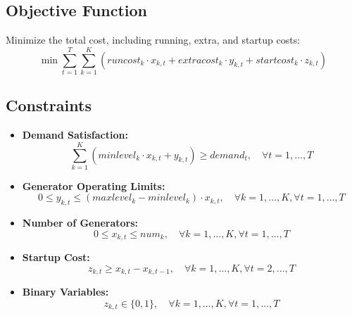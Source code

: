 \documentclass{article}
\begin{document}
\subsection*{Objective Function}
Minimize the total cost, including running, extra, and startup costs:
\[
\min \sum_{t=1}^{T} \sum_{k=1}^{K} \left( runcost_k \cdot x_{k,t} + extracost_k \cdot y_{k,t} + startcost_k \cdot z_{k,t} \right)
\]

\subsection*{Constraints}
\begin{itemize}
    \item \textbf{Demand Satisfaction:}
    \[
    \sum_{k=1}^{K} \left( minlevel_k \cdot x_{k,t} + y_{k,t} \right) \ge demand_t, \quad \forall t = 1,\ldots,T
    \]
    \item \textbf{Generator Operating Limits:}
    \[
    0 \le y_{k,t} \le (maxlevel_k - minlevel_k) \cdot x_{k,t}, \quad \forall k = 1,\ldots,K, \forall t = 1,\ldots,T
    \]
    \item \textbf{Number of Generators:}
    \[
    0 \le x_{k,t} \le num_k, \quad \forall k = 1,\ldots,K, \forall t = 1,\ldots,T
    \]
    \item \textbf{Startup Cost:}
    \[
    z_{k,t} \ge x_{k,t} - x_{k,t-1}, \quad \forall k = 1,\ldots,K, \forall t = 2,\ldots,T
    \]
    \item \textbf{Binary Variables:}
    \[
    z_{k,t} \in \{0, 1\}, \quad \forall k = 1,\ldots,K, \forall t = 1,\ldots,T
    \]
\end{itemize}
\end{document}
